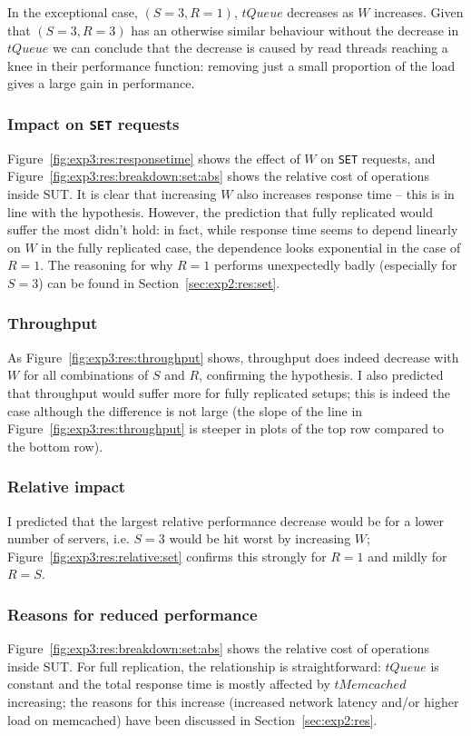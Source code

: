 \documentclass[11pt]{article}
\newcommand{\set}[0]{\texttt{SET}}
\begin{document}
In the exceptional case, $(S=3,R=1)$, $tQueue$ decreases as $W$ increases. Given that $(S=3,R=3)$ has an otherwise similar behaviour without the decrease in $tQueue$ we can conclude that the decrease is caused by read threads reaching a knee in their performance function: removing just a small proportion of the load gives a large gain in performance.

\subsubsection{Impact on \set{} requests}

Figure~\ref{fig:exp3:res:responsetime} shows the effect of $W$ on \set{} requests, and Figure~\ref{fig:exp3:res:breakdown:set:abs} shows the relative cost of operations inside SUT. It is clear that increasing $W$ also increases response time -- this is in line with the hypothesis. However, the prediction that fully replicated would suffer the most didn't hold: in fact, while response time seems to depend linearly on $W$ in the fully replicated case, the dependence looks exponential in the case of $R=1$. The reasoning for why $R=1$ performs unexpectedly badly (especially for $S=3$) can be found in Section~\ref{sec:exp2:res:set}.

\subsubsection{Throughput}
As Figure~\ref{fig:exp3:res:throughput} shows, throughput does indeed decrease with $W$ for all combinations of $S$ and $R$, confirming the hypothesis. I also predicted that throughput would suffer more for fully replicated setups; this is indeed the case although the difference is not large (the slope of the line in Figure~\ref{fig:exp3:res:throughput} is steeper in plots of the top row compared to the bottom row).

\subsubsection{Relative impact}
I predicted that the largest relative performance decrease would be for a lower number of servers, i.e. $S=3$ would be hit worst by increasing $W$; Figure~\ref{fig:exp3:res:relative:set} confirms this strongly for $R=1$ and mildly for $R=S$.

\subsubsection{Reasons for reduced performance}
Figure~\ref{fig:exp3:res:breakdown:set:abs} shows the relative cost of operations inside SUT. For full replication, the relationship is straightforward: $tQueue$ is constant and the total response time is mostly affected by $tMemcached$ increasing; the reasons for this increase (increased network latency and/or higher load on memcached) have been discussed in Section~\ref{sec:exp2:res}.
\end{document}
